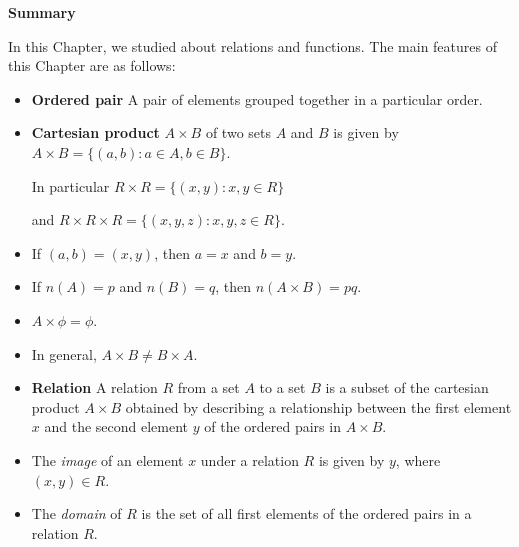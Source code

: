 \documentclass[11pt]{article}
\begin{document}
\vspace{0.5cm}
\begin{mdframed}[
  backgroundcolor=cyan!15,
  linecolor=cyan!40,
  linewidth=0pt,
  leftmargin=0pt,
  rightmargin=0pt,
  innerleftmargin=14pt,
  innerrightmargin=14pt,
  innertopmargin=12pt,
  innerbottommargin=12pt,
  skipabove=10pt,
  skipbelow=10pt,
  split=true
]

\begin{center}
{\large\bfseries\textcolor{cyan!60!black}{Summary}}
\end{center}

In this Chapter, we studied about relations and functions.
The main features of this Chapter are as follows:

\begin{itemize}[label=$\diamond$]

\item \textbf{Ordered pair}  
A pair of elements grouped together in a particular order.

\item \textbf{Cartesian product}  
$A \times B$ of two sets $A$ and $B$ is given by  
$A \times B = \{(a,b): a \in A, b \in B\}$.

In particular  
$R \times R = \{(x,y): x,y \in R\}$  

and  
$R \times R \times R = \{(x,y,z): x,y,z \in R\}$.

\item If $(a,b) = (x,y)$, then $a = x$ and $b = y$.

\item If $n(A) = p$ and $n(B) = q$, then $n(A \times B) = pq$.

\item $A \times \phi = \phi$.

\item In general, $A \times B \neq B \times A$.

\item \textbf{Relation}  
A relation $R$ from a set $A$ to a set $B$ is a subset of the cartesian product
$A \times B$ obtained by describing a relationship between the first element
$x$ and the second element $y$ of the ordered pairs in $A \times B$.

\item The \textit{image} of an element $x$ under a relation $R$ is given by $y$,
where $(x,y) \in R$.

\item The \textit{domain} of $R$ is the set of all first elements of the ordered
pairs in a relation $R$.


\end{itemize}
\end{mdframed}
\end{document}
